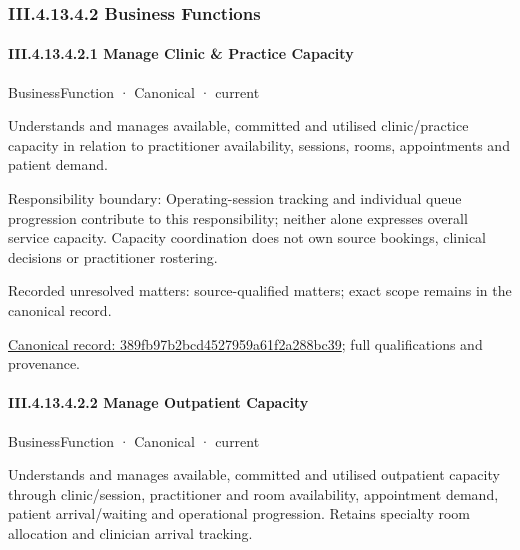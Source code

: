 \subsubsection*{III.4.13.4.2 Business Functions}
\label{navigation:III.4.13.4.2}

\paragraph*{III.4.13.4.2.1 Manage Clinic \& Practice Capacity}
\label{navigation:III.4.13.4.2.1}

\label{element:389fb97b2bcd4527959a61f2a288bc39}
{\small BusinessFunction · Canonical · current}\par

Understands and manages available, committed and utilised clinic/practice capacity in relation to practitioner availability, sessions, rooms, appointments and patient demand.



Responsibility boundary: Operating-session tracking and individual queue progression contribute to this responsibility; neither alone expresses overall service capacity. Capacity coordination does not own source bookings, clinical decisions or practitioner rostering.


{\small Recorded unresolved matters: source-qualified matters; exact scope remains in the canonical record.}\par
{\footnotesize \href{../../../../../../../continuum/business/business-function/389fb97b2bcd4527959a61f2a288bc39.md}{Canonical record: 389fb97b2bcd4527959a61f2a288bc39}; full qualifications and provenance.}\par
\paragraph*{III.4.13.4.2.2 Manage Outpatient Capacity}
\label{navigation:III.4.13.4.2.2}

\label{element:45fd6190b7334f838575881725f6a66b}
{\small BusinessFunction · Canonical · current}\par

Understands and manages available, committed and utilised outpatient capacity through clinic/session, practitioner and room availability, appointment demand, patient arrival/waiting and operational progression. Retains specialty room allocation and clinician arrival tracking.



